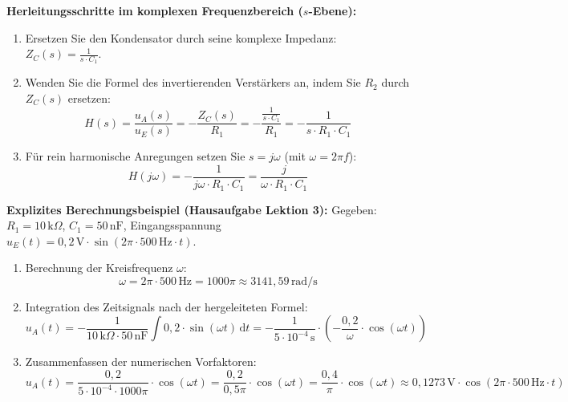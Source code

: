 \documentclass[11pt,a4paper]{article}
\begin{document}
\textbf{Herleitungsschritte im komplexen Frequenzbereich ($s$-Ebene):}
\begin{enumerate}
    \item Ersetzen Sie den Kondensator durch seine komplexe Impedanz: $Z_C(s) = \frac{1}{s \cdot C_1}$.
    \item Wenden Sie die Formel des invertierenden Verstärkers an, indem Sie $R_2$ durch $Z_C(s)$ ersetzen:
    \begin{equation}
    H(s) = \frac{u_A(s)}{u_E(s)} = -\frac{Z_C(s)}{R_1} = -\frac{\frac{1}{s \cdot C_1}}{R_1} = -\frac{1}{s \cdot R_1 \cdot C_1}
    \end{equation}
    \item Für rein harmonische Anregungen setzen Sie $s = j\omega$ (mit $\omega = 2\pi f$):
    \begin{equation}
    H(j\omega) = -\frac{1}{j\omega \cdot R_1 \cdot C_1} = \frac{j}{\omega \cdot R_1 \cdot C_1}
    \end{equation}
\end{enumerate}
\textbf{Explizites Berechnungsbeispiel (Hausaufgabe Lektion 3):}
Gegeben: $R_1 = 10\,\text{k}\Omega$, $C_1 = 50\,\text{nF}$, Eingangsspannung $u_E(t) = 0{,}2\,\text{V} \cdot \sin(2\pi \cdot 500\,\text{Hz} \cdot t)$.
\begin{enumerate}
    \item Berechnung der Kreisfrequenz $\omega$:
    \begin{equation}
    \omega = 2\pi \cdot 500\,\text{Hz} = 1000\pi \approx 3141{,}59\,\text{rad/s}
    \end{equation}
    \item Integration des Zeitsignals nach der hergeleiteten Formel:
    \begin{equation}
    u_A(t) = -\frac{1}{10\,\text{k}\Omega \cdot 50\,\text{nF}} \int 0{,}2 \cdot \sin(\omega t) \,\text{d}t = -\frac{1}{5 \cdot 10^{-4}\,\text{s}} \cdot \left( -\frac{0{,}2}{\omega} \cdot \cos(\omega t) \right)
    \end{equation}
    \item Zusammenfassen der numerischen Vorfaktoren:
    \begin{equation}
    u_A(t) = \frac{0{,}2}{5 \cdot 10^{-4} \cdot 1000\pi} \cdot \cos(\omega t) = \frac{0{,}2}{0{,}5\pi} \cdot \cos(\omega t) = \frac{0{,}4}{\pi} \cdot \cos(\omega t) \approx 0{,}1273\,\text{V} \cdot \cos(2\pi \cdot 500\,\text{Hz} \cdot t)
    \end{equation}
\end{enumerate}
\end{document}
